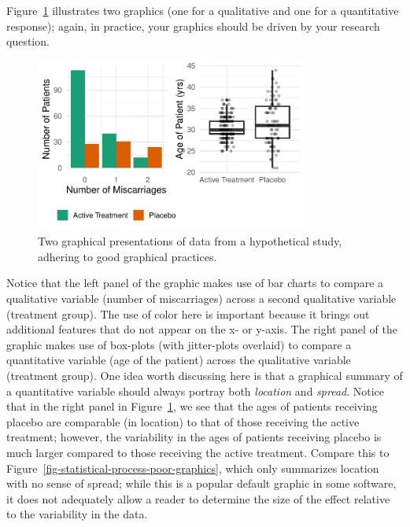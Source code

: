 \documentclass[
  letterpaper,
  DIV=11,
  numbers=noendperiod]{scrreprt}
\theoremstyle{definition}
\theoremstyle{definition}
\theoremstyle{remark}
\begin{document}
Figure~\ref{fig-statistical-process-graphics} illustrates two graphics
(one for a qualitative and one for a quantitative response); again, in
practice, your graphics should be driven by your research question.

\begin{figure}

{\centering \includegraphics[width=0.8\textwidth,height=\textheight]{./images/fig-statistical-process-graphics-1.pdf}

}

\caption{\label{fig-statistical-process-graphics}Two graphical
presentations of data from a hypothetical study, adhering to good
graphical practices.}

\end{figure}

Notice that the left panel of the graphic makes use of bar charts to
compare a qualitative variable (number of miscarriages) across a second
qualitative variable (treatment group). The use of color here is
important because it brings out additional features that do not appear
on the x- or y-axis. The right panel of the graphic makes use of
box-plots (with jitter-plots overlaid) to compare a quantitative
variable (age of the patient) across the qualitative variable (treatment
group). One idea worth discussing here is that a graphical summary of a
quantitative variable should always portray both \emph{location} and
\emph{spread}. Notice that in the right panel in
Figure~\ref{fig-statistical-process-graphics}, we see that the ages of
patients receiving placebo are comparable (in location) to that of those
receiving the active treatment; however, the variability in the ages of
patients receiving placebo is much larger compared to those receiving
the active treatment. Compare this to
Figure~\ref{fig-statistical-process-poor-graphics}, which only
summarizes location with no sense of spread; while this is a popular
default graphic in some software, it does not adequately allow a reader
to determine the size of the effect relative to the variability in the
data.
\end{document}
